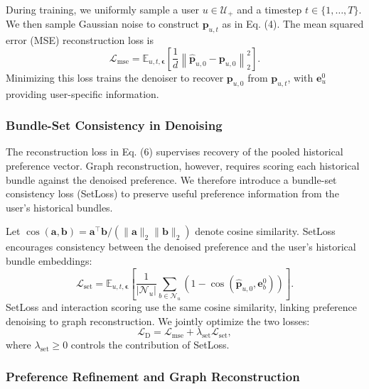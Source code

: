 \documentclass[letterpaper]{article}
\begin{document}
During training, we uniformly sample a user $u\in\mathcal U_+$ and a timestep $t\in\{1,\ldots,T\}$. We then sample Gaussian noise to construct $\mathbf p_{u,t}$ as in Eq. (4). The mean squared error (MSE) reconstruction loss is
\begin{equation}
\mathcal L_{\mathrm{mse}}
=\mathbb E_{u,t,\boldsymbol\epsilon}
\left[
\frac{1}{d}
\left\|\widehat{\mathbf p}_{u,0}-\mathbf p_{u,0}\right\|_2^2
\right].
\tag{6}
\end{equation}
Minimizing this loss trains the denoiser to recover $\mathbf p_{u,0}$ from $\mathbf p_{u,t}$, with $\mathbf e_u^0$ providing user-specific information.

\subsubsection{Bundle-Set Consistency in Denoising}

The reconstruction loss in Eq. (6) supervises recovery of the pooled historical preference vector. Graph reconstruction, however, requires scoring each historical bundle against the denoised preference. We therefore introduce a bundle-set consistency loss (SetLoss) to preserve useful preference information from the user's historical bundles.

Let $\cos(\mathbf a,\mathbf b)=\mathbf a^\top\mathbf b/(\|\mathbf a\|_2\|\mathbf b\|_2)$ denote cosine similarity. SetLoss encourages consistency between the denoised preference and the user's historical bundle embeddings:
\begin{equation}
\mathcal L_{\mathrm{set}}
=\mathbb E_{u,t,\boldsymbol\epsilon}
\left[
\frac{1}{|\mathcal N_u|}
\sum_{b\in\mathcal N_u}
\left(1-\cos
\left(\widehat{\mathbf p}_{u,0},\mathbf e_b^0\right)\right)
\right].
\tag{7}
\end{equation}
SetLoss and interaction scoring use the same cosine similarity, linking preference denoising to graph reconstruction. We jointly optimize the two losses:
\begin{equation}
\mathcal L_{\mathrm D}
=\mathcal L_{\mathrm{mse}}
+\lambda_{\mathrm{set}}\mathcal L_{\mathrm{set}},
\tag{8}
\end{equation}
where $\lambda_{\mathrm{set}}\geq 0$ controls the contribution of SetLoss.

\subsubsection{Preference Refinement and Graph Reconstruction}
\end{document}
